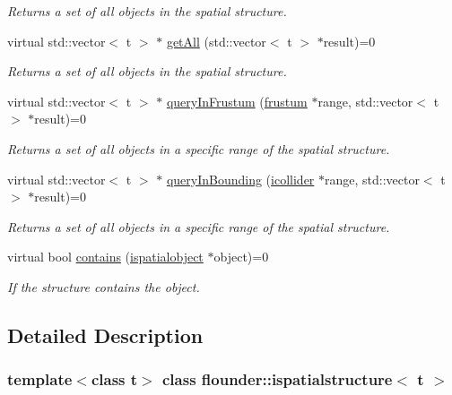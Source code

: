\begin{DoxyCompactItemize}
\begin{DoxyCompactList}\small\item\em Returns a set of all objects in the spatial structure. \end{DoxyCompactList}\item 
virtual std\+::vector$<$ t $>$ $\ast$ \hyperlink{classflounder_1_1ispatialstructure_adf21d28c4c648b0b97763c23f2051484}{get\+All} (std\+::vector$<$ t $>$ $\ast$result)=0
\begin{DoxyCompactList}\small\item\em Returns a set of all objects in the spatial structure. \end{DoxyCompactList}\item 
virtual std\+::vector$<$ t $>$ $\ast$ \hyperlink{classflounder_1_1ispatialstructure_aa27638201d27f6140a84c0e3c917f405}{query\+In\+Frustum} (\hyperlink{classflounder_1_1frustum}{frustum} $\ast$range, std\+::vector$<$ t $>$ $\ast$result)=0
\begin{DoxyCompactList}\small\item\em Returns a set of all objects in a specific range of the spatial structure. \end{DoxyCompactList}\item 
virtual std\+::vector$<$ t $>$ $\ast$ \hyperlink{classflounder_1_1ispatialstructure_abd5dd6c5d3ec13163b4edf70f083eb4c}{query\+In\+Bounding} (\hyperlink{classflounder_1_1icollider}{icollider} $\ast$range, std\+::vector$<$ t $>$ $\ast$result)=0
\begin{DoxyCompactList}\small\item\em Returns a set of all objects in a specific range of the spatial structure. \end{DoxyCompactList}\item 
virtual bool \hyperlink{classflounder_1_1ispatialstructure_a80e36c5dca0995c27d7222e3c3fc1b90}{contains} (\hyperlink{classflounder_1_1ispatialobject}{ispatialobject} $\ast$object)=0
\begin{DoxyCompactList}\small\item\em If the structure contains the object. \end{DoxyCompactList}\end{DoxyCompactItemize}


\subsection{Detailed Description}
\subsubsection*{template$<$class t$>$\newline
class flounder\+::ispatialstructure$<$ t $>$}


